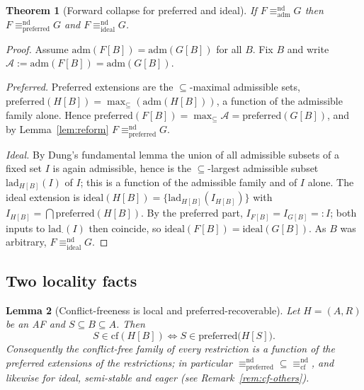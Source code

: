 \documentclass{amsart}
\newtheorem{theorem}{Theorem}
\newtheorem{lemma}[theorem]{Lemma}
\theoremstyle{remark}
\begin{document}
\begin{theorem}[Forward collapse for preferred and ideal]\label{thm:adm-forward}
If $F\equiv^{\mathrm{nd}}_{\mathrm{adm}}G$ then
$F\equiv^{\mathrm{nd}}_{\mathrm{preferred}}G$ and
$F\equiv^{\mathrm{nd}}_{\mathrm{ideal}}G$.
\end{theorem}

\begin{proof}
Assume $\mathrm{adm}(F[B])=\mathrm{adm}(G[B])$ for all $B$.  Fix $B$ and write
$\mathcal A:=\mathrm{adm}(F[B])=\mathrm{adm}(G[B])$.

\emph{Preferred.}  Preferred extensions are the $\subseteq$-maximal admissible
sets, $\mathrm{preferred}(H[B])=\max_\subseteq(\mathrm{adm}(H[B]))$, a function of
the admissible family alone.  Hence
$\mathrm{preferred}(F[B])=\max_\subseteq\mathcal A=\mathrm{preferred}(G[B])$, and
by Lemma~\ref{lem:reform} $F\equiv^{\mathrm{nd}}_{\mathrm{preferred}}G$.

\emph{Ideal.}  By Dung's fundamental lemma the union of all admissible subsets of
a fixed set $I$ is again admissible, hence is the $\subseteq$-largest admissible
subset $\mathrm{lad}_{H[B]}(I)$ of $I$; this is a function of the admissible
family and of $I$ alone.  The ideal extension is
$\mathrm{ideal}(H[B])=\{\mathrm{lad}_{H[B]}(I_{H[B]})\}$ with
$I_{H[B]}=\bigcap\mathrm{preferred}(H[B])$.  By the preferred part,
$I_{F[B]}=I_{G[B]}=:I$; both inputs to $\mathrm{lad}_{\cdot}(I)$ then coincide, so
$\mathrm{ideal}(F[B])=\mathrm{ideal}(G[B])$.  As $B$ was arbitrary,
$F\equiv^{\mathrm{nd}}_{\mathrm{ideal}}G$.
\end{proof}

\subsection{Two locality facts}

\begin{lemma}[Conflict-freeness is local and preferred-recoverable]
\label{lem:cf-recover}
Let $H=(A,R)$ be an AF and $S\subseteq B\subseteq A$.  Then
\[
S\in\mathrm{cf}(H[B])\iff S\in\mathrm{preferred}\bigl(H[S]\bigr).
\]
Consequently the conflict-free family of every restriction is a function of the
preferred extensions of the restrictions; in particular
$\equiv^{\mathrm{nd}}_{\mathrm{preferred}}\subseteq
\equiv^{\mathrm{nd}}_{\mathrm{cf}}$, and likewise for ideal, semi-stable and
eager (see Remark~\ref{rem:cf-others}).
\end{lemma}
\end{document}
